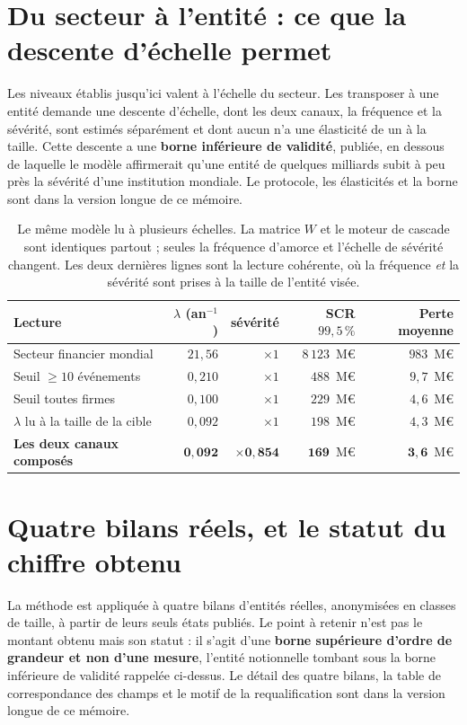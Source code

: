 \section{Du secteur à l'entité : ce que la descente d'échelle permet}
\label{sec:ancrage}
Les niveaux établis jusqu'ici valent à l'échelle du secteur. Les transposer à une entité
demande une descente d'échelle, dont les deux canaux, la fréquence et la sévérité, sont
estimés séparément et dont aucun n'a une élasticité de un à la taille. Cette descente a
une \textbf{borne inférieure de validité}, publiée, en dessous de laquelle le modèle
affirmerait qu'une entité de quelques milliards subit à peu près la sévérité d'une
institution mondiale. Le protocole, les élasticités et la borne sont dans la version longue de ce mémoire.

\begin{table}[htbp]\centering
\small
\begin{tabular}{lrrrr}
\toprule
Lecture & $\lambda$ (an$^{-1}$) & sévérité & SCR $99{,}5\,\%$ & Perte moyenne \\
\midrule
Secteur financier mondial & $21{,}56$ & $\times 1$ & $8\,123$~M\euro & $983$~M\euro \\
Seuil \og{}$\geq 10$ événements\fg{} & $0{,}210$ & $\times 1$ & $488$~M\euro & $9{,}7$~M\euro \\
Seuil \og{}toutes firmes\fg{} & $0{,}100$ & $\times 1$ & $229$~M\euro & $4{,}6$~M\euro \\
$\lambda$ lu à la taille de la cible & $0{,}092$ & $\times 1$ & $198$~M\euro & $4{,}3$~M\euro \\
\textbf{Les deux canaux composés} & $\mathbf{0{,}092}$ & $\mathbf{\times 0{,}854}$ &
$\mathbf{169}$~M\euro & $\mathbf{3{,}6}$~M\euro \\
\bottomrule
\end{tabular}
\caption{Le même modèle lu à plusieurs échelles. La matrice $W$ et le moteur de cascade sont
identiques partout ; seules la fréquence d'amorce et l'échelle de sévérité changent. Les deux
dernières lignes sont la lecture cohérente, où la fréquence \emph{et} la sévérité sont prises
à la taille de l'entité visée.}
\label{tab:echelle}
\end{table}

\section{Quatre bilans réels, et le statut du chiffre obtenu}
\label{sec:entites-reelles}
La méthode est appliquée à quatre bilans d'entités réelles, anonymisées en classes de
taille, à partir de leurs seuls états publiés. Le point à retenir n'est pas le montant
obtenu mais son statut : il s'agit d'une \textbf{borne supérieure d'ordre de grandeur et non
d'une mesure}, l'entité notionnelle tombant sous la borne inférieure de validité rappelée
ci-dessus. Le détail des quatre bilans, la table de correspondance des champs et le
motif de la requalification sont dans la version longue de ce mémoire.

